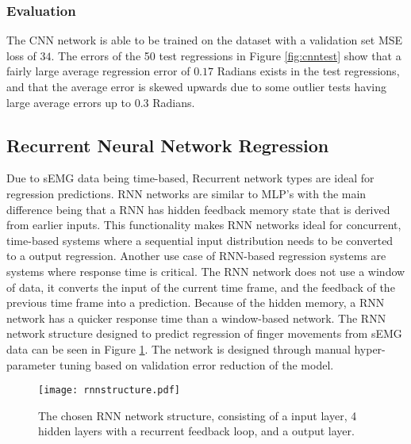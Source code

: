\documentclass[../main.tex]{subfiles}
\begin{document}
\subsubsection{Evaluation}

The CNN network is able to be trained on the dataset with a validation set MSE loss of $34$.
The errors of the 50 test regressions in Figure \ref{fig:cnntest} show that a fairly large average regression error of $0.17$ Radians exists in the test regressions, and that the average error is skewed upwards due to some outlier tests having large average errors up to $0.3$ Radians.



\subsection{Recurrent Neural Network Regression}

Due to sEMG data being time-based, Recurrent network types are ideal for regression predictions.
RNN networks are similar to MLP's with the main difference being that a RNN has hidden feedback  memory state that is derived from earlier inputs.
This functionality makes RNN networks ideal for concurrent, time-based systems where a sequential input distribution needs to be converted to a output regression.  
Another use case of RNN-based regression systems are systems where response time is critical.
The RNN network does not use a window of data, it converts the input of the current time frame, and the feedback of the previous time frame into a prediction.
Because of the hidden memory, a RNN network has a quicker response time than a window-based network.
The RNN network structure designed to predict regression of finger movements from sEMG data can be seen in Figure \ref{fig:rnn_structure}.
The network is designed through manual hyper-parameter tuning based on validation error reduction of the model.



\begin{figure}[H]
\begin{center}
\texttt{[image: rnnstructure.pdf]}
\caption{The chosen RNN network structure, consisting of a input layer, 4 hidden layers with a recurrent feedback loop, and a output layer.}
\label{fig:rnn_structure}
\end{center}
\end{figure}
\end{document}

